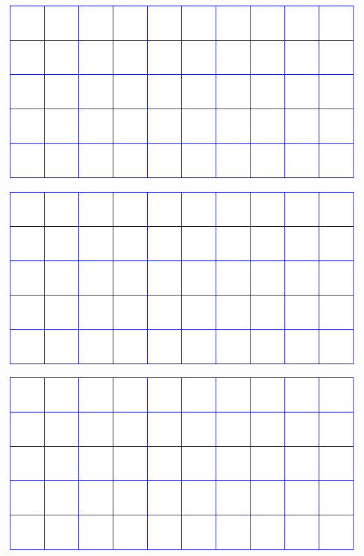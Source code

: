 \documentclass[12pt,ngerman]{beamer}
\begin{document}
\begin{frame}

\includegraphics[width=\textwidth,page=1]{multi-tikz}

\end{frame}

\begin{frame}

\includegraphics[width=\textwidth,page=2]{multi-tikz}

\end{frame}

\begin{frame}

\includegraphics[width=\textwidth,page=3]{multi-tikz}

\end{frame}
\end{document}
